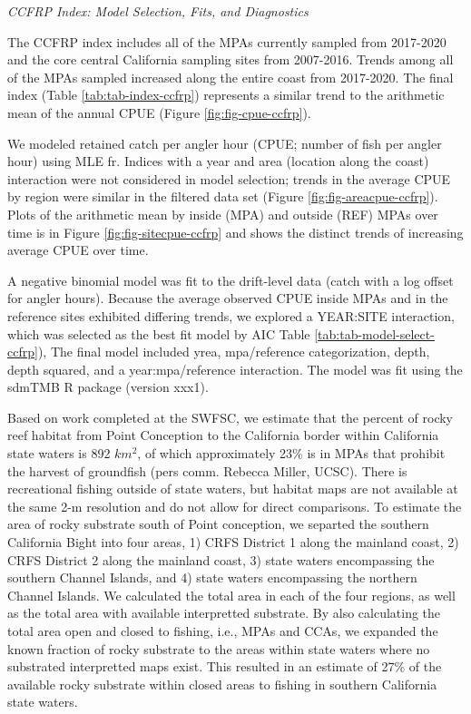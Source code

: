 \documentclass[11pt,
  english,
  letterpaper,
]{article}
\begin{document}
\emph{CCFRP Index: Model Selection, Fits, and Diagnostics}

The CCFRP index includes all of the MPAs currently sampled from 2017-2020 and the core central California sampling sites from 2007-2016. Trends among all of the MPAs sampled increased along the entire coast from 2017-2020. The final index (Table \ref{tab:tab-index-ccfrp}) represents a similar trend to the arithmetic mean of the annual CPUE (Figure \ref{fig:fig-cpue-ccfrp}).

We modeled retained catch per angler hour (CPUE; number of fish per angler hour) using MLE fr. Indices with a year and area (location along the coast) interaction were not considered in model selection; trends in the average CPUE by region were similar in the filtered data set (Figure \ref{fig:fig-areacpue-ccfrp}). Plots of the arithmetic mean by inside (MPA) and outside (REF) MPAs over time is in Figure \ref{fig:fig-sitecpue-ccfrp} and shows the distinct trends of increasing average CPUE over time.

A negative binomial model was fit to the drift-level data (catch with a log offset for angler hours). Because the average observed CPUE inside MPAs and in the reference sites exhibited differing trends, we explored a YEAR:SITE interaction, which was selected as the best fit model by AIC Table \ref{tab:tab-model-select-ccfrp}), The final model included yrea, mpa/reference categorization, depth, depth squared, and a year:mpa/reference interaction. The model was fit using the sdmTMB R package (version xxx1).

Based on work completed at the SWFSC, we estimate that the percent of rocky reef habitat from Point Conception to the California border within California state waters is 892 \(km^2\), of which approximately 23\% is in MPAs that prohibit the harvest of groundfish (pers comm. Rebecca Miller, UCSC). There is recreational fishing outside of state waters, but habitat maps are not available at the same 2-m resolution and do not allow for direct comparisons. To estimate the area of rocky substrate south of Point conception, we separted the southern California Bight into four areas, 1) CRFS District 1 along the mainland coast, 2) CRFS District 2 along the mainland coast, 3) state waters encompassing the southern Channel Islands, and 4) state waters encompassing the northern Channel Islands. We calculated the total area in each of the four regions, as well as the total area with available interpretted substrate. By also calculating the total area open and closed to fishing, i.e., MPAs and CCAs, we expanded the known fraction of rocky substrate to the areas within state waters where no substrated interpretted maps exist. This resulted in an estimate of 27\% of the available rocky substrate within closed areas to fishing in southern California state waters.
\end{document}
